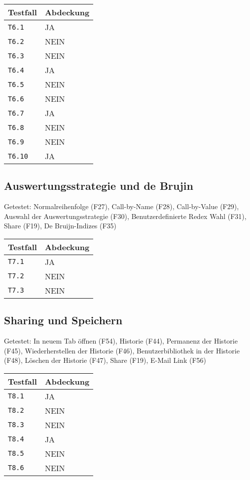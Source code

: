 \documentclass[parskip=full,11pt,twoside]{scrartcl}
\newcommand{\testline}[2]{
    \texttt{#1} & \ifthenelse{\equal{#2}{JA}}{\cellcolor{green!20}}{\cellcolor{red!20}}#2 \\ \hline
}
\begin{document}
    \label{shortcuts}
    \begin{center}
        \begin{tabular}{ p{9cm} p{4cm}}
            Testfall & Abdeckung \\ \hline
            \testline{T6.1}{JA}
            \testline{T6.2}{NEIN}
            \testline{T6.3}{NEIN}
            \testline{T6.4}{JA}
            \testline{T6.5}{NEIN}
            \testline{T6.6}{NEIN}
            \testline{T6.7}{JA}
            \testline{T6.8}{NEIN}
            \testline{T6.9}{NEIN}
            \testline{T6.10}{JA}
        \end{tabular}
    \end{center}

\subsection{Auswertungsstrategie und de Brujin}
    Getestet:
    Normalreihenfolge (F27),
    Call-by-Name (F28),
    Call-by-Value (F29),
    Auswahl der Auswertungsstrategie (F30),
    Benutzerdefinierte Redex Wahl (F31),
    Share (F19),
    De Bruijn-Indizes (F35)

    \label{shortcuts}
    \begin{center}
        \begin{tabular}{ p{9cm} p{4cm}}
            Testfall & Abdeckung \\ \hline
            \testline{T7.1}{JA}
            \testline{T7.2}{NEIN}
            \testline{T7.3}{NEIN}
        \end{tabular}
    \end{center}

\subsection{Sharing und Speichern}
    Getestet:
    In neuem Tab öffnen (F54),
    Historie (F44),
    Permanenz der Historie (F45),
    Wiederherstellen der Historie (F46),
    Benutzerbibliothek in der Historie (F48),
    Löschen der Historie (F47),
    Share (F19),
    E-Mail Link (F56)

    \label{shortcuts}
    \begin{center}
        \begin{tabular}{ p{9cm} p{4cm}}
            Testfall & Abdeckung \\ \hline
            \testline{T8.1}{JA}
            \testline{T8.2}{NEIN}
            \testline{T8.3}{NEIN}
            \testline{T8.4}{JA}
            \testline{T8.5}{NEIN}
            \testline{T8.6}{NEIN}
        \end{tabular}
    \end{center}
\end{document}
